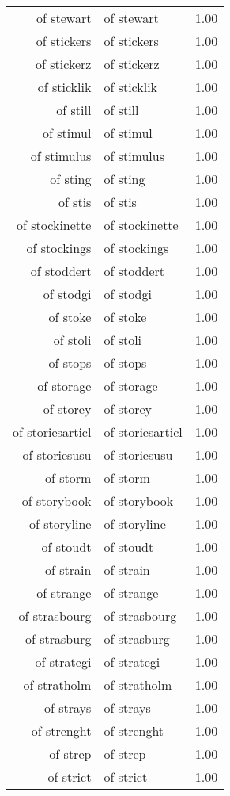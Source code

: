 \begin{table}[ht]
\begin{tabular}{rlr}
  of stewart & of stewart & 1.00 \\ 
  of stickers & of stickers & 1.00 \\ 
  of stickerz & of stickerz & 1.00 \\ 
  of sticklik & of sticklik & 1.00 \\ 
  of still & of still & 1.00 \\ 
  of stimul & of stimul & 1.00 \\ 
  of stimulus & of stimulus & 1.00 \\ 
  of sting & of sting & 1.00 \\ 
  of stis & of stis & 1.00 \\ 
  of stockinette & of stockinette & 1.00 \\ 
  of stockings & of stockings & 1.00 \\ 
  of stoddert & of stoddert & 1.00 \\ 
  of stodgi & of stodgi & 1.00 \\ 
  of stoke & of stoke & 1.00 \\ 
  of stoli & of stoli & 1.00 \\ 
  of stops & of stops & 1.00 \\ 
  of storage & of storage & 1.00 \\ 
  of storey & of storey & 1.00 \\ 
  of storiesarticl & of storiesarticl & 1.00 \\ 
  of storiesusu & of storiesusu & 1.00 \\ 
  of storm & of storm & 1.00 \\ 
  of storybook & of storybook & 1.00 \\ 
  of storyline & of storyline & 1.00 \\ 
  of stoudt & of stoudt & 1.00 \\ 
  of strain & of strain & 1.00 \\ 
  of strange & of strange & 1.00 \\ 
  of strasbourg & of strasbourg & 1.00 \\ 
  of strasburg & of strasburg & 1.00 \\ 
  of strategi & of strategi & 1.00 \\ 
  of stratholm & of stratholm & 1.00 \\ 
  of strays & of strays & 1.00 \\ 
  of strenght & of strenght & 1.00 \\ 
  of strep & of strep & 1.00 \\ 
  of strict & of strict & 1.00 \\ 

\end{tabular}
\end{table}
